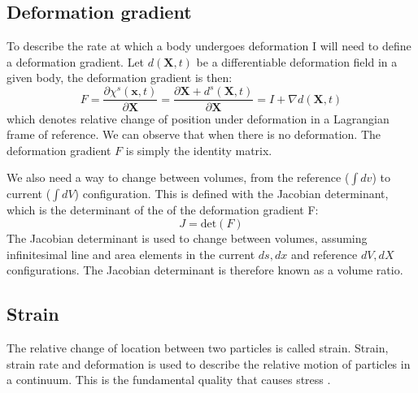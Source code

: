 \subsection{Deformation gradient}
To describe the rate at which a body undergoes deformation I will need to define a deformation gradient.
Let $d(\textbf{X},t)$ be a differentiable deformation field in a given body, the deformation gradient is then:  
\begin{equation}
\label{eq:deformation_gradient}
F = \frac{\partial \chi^s(\textbf{x},t)}{\partial \textbf{X}} = \frac{\partial \textbf{X}  + d^s(\textbf{X} ,t) }{\partial \textbf{X}} =  I + \nabla d(\textbf{X},t) 
\end{equation}
which denotes relative change of position under deformation in a Lagrangian frame of reference. We can observe that when there is no deformation. The deformation gradient $F$ is simply the identity matrix. \newline

We also need a way to change between volumes, from the reference ($\int dv$) to current ($\int dV$) configuration. This is defined with the Jacobian determinant, which is the determinant of the of the deformation gradient F:
\begin{equation}\label{eq:J}
J = \text{det}(F)
\end{equation}
The Jacobian determinant is used to change between volumes, assuming infinitesimal line and area elements in the current $ds, dx$ and reference $dV,dX$ configurations. The Jacobian determinant is therefore known as a volume ratio.

\subsection{Strain}
The relative change of location between two particles is called strain. Strain, strain rate and deformation is used to describe the relative motion of particles in a continuum. This is the fundamental quality that causes stress \cite{Richter2016}.

